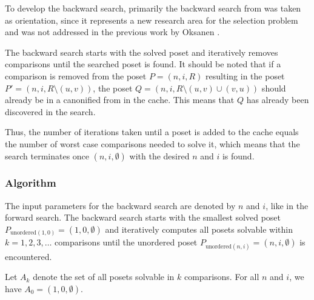 \documentclass[10pt,journal,compsoc]{IEEEtran}
\begin{document}
To develop the backward search, primarily the backward search from \cite{stober2022lower} was taken as orientation, since it represents a new research area for the selection problem and was not addressed in the previous work by Oksanen \cite{Oksanen}.

The backward search starts with the solved poset and iteratively removes comparisons until the searched poset is found.
It should be noted that if a comparison is removed from the poset $P = (n, i, R)$ resulting in the poset $P' = (n, i, R \setminus (u, v))$,
the poset $Q = (n, i, R \setminus (u, v) \cup (v, u))$ should already be in a canonified from in the cache.
This means that $Q$ has already been discovered in the search.

Thus, the number of iterations taken until a poset is added to the cache equals the number of worst case comparisons needed to solve it, which means that the search terminates once $(n, i, \emptyset)$ with the desired $n$ and $i$ is found.



\subsubsection{Algorithm} \label{sec:backward:algorithm}
The input parameters for the backward search are denoted by $n$ and $i$, like in the forward search.
The backward search starts with the smallest solved poset $P_{\text{unordered} (1, 0)} = (1, 0, \emptyset)$ and iteratively computes all posets solvable within $k = 1, 2, 3, \dots$ comparisons until the unordered poset $P_{\text{unordered} (n, i)} = (n, i, \emptyset)$ is encountered.

Let $A_k$ denote the set of all posets solvable in $k$ comparisons.
For all $n$ and $i$, we have $A_0 = { (1, 0, \emptyset) }$.
\end{document}
